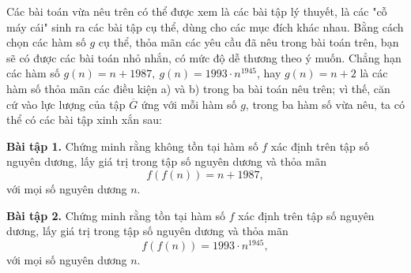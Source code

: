 Các bài toán vừa nêu trên có thể được xem là các bài tập lý thuyết, là các "cỗ máy cái" sinh ra các bài tập cụ thể, dùng cho các mục đích khác nhau. Bằng cách chọn các hàm số $g$ cụ thể, thỏa mãn các yêu cầu đã nêu trong bài toán trên, bạn sẽ có được các bài toán nhỏ nhắn, có mức độ dễ thương theo ý muốn. Chẳng hạn các hàm số $g(n)=n+1987,\ g(n)=1993\cdot n^{1945}$, hay $g(n)=n+2$ là các hàm số thỏa mãn các điều kiện a) và b) trong ba bài toán nêu trên; vì thế, căn cứ vào lực lượng của tập $\overline{G}$ ứng với mỗi hàm số $g$, trong ba hàm số vừa nêu, ta có thể có các bài tập xinh xắn sau:

{\bf Bài tập 1.} Chứng minh rằng không tồn tại hàm số $f$ xác định trên tập số nguyên dương, lấy giá trị trong tập số nguyên dương và thỏa mãn $$f(f(n))=n+1987,$$ với mọi số nguyên dương $n$.

{\bf Bài tập 2.} Chứng minh rằng tồn tại hàm số $f$ xác định trên tập số nguyên dương, lấy giá trị trong tập số nguyên dương và thỏa mãn $$f(f(n))=1993\cdot n^{1945},$$ với mọi số nguyên dương $n$.

